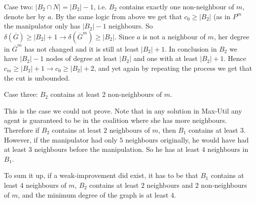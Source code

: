 Case two: $|B_2\cap N| = |B_2| -1$, i.e. $B_2$ contains exactly one non-neighbour of $m$, denote her by $a$.
By the same logic from above we get that $c_0 \geq |B_2|$ (as in $P^m$ the manipulator only has $|B_2| -1$ neighbours. So $\delta(\overline{G}) \geq |B_2| + 1 \rightarrow \delta(\overline{G}^m) \geq |B_2|$. Since $a$ is not a neighbour of $m$, her degree in $\overline{G}^m$ has not changed and it is still at least $|B_2| +1$. In conclusion in $B_2$ we have $|B_2|-1$ nodes of degree at least $|B_2|$ and one with at least $|B_2| +1$. Hence $c_m \geq |B_2| +1 \rightarrow c_0 \geq |B_2| + 2$, and yet again by repeating the process we get that the cut is unbounded.

Case three: $B_2$ contains at least 2 non-neighbours of $m$.

This is the case we could not prove. Note that in any solution in Max-Util any agent is guaranteed to be in the coalition where she has more neighbours. Therefore if $B_2$ contains at least $2$ neighbours of $m$, then $B_1$ contains at least $3$. However, if the manipulator had only $5$ neighbours originally, he would have had at least $3$ neighbours before the manipulation. So he has at least $4$ neighbours in $B_1$.


To sum it up, if a weak-improvement did exist, it has to be that $B_1$ contains at least $4$ neighbours of $m$, $B_2$ contains at least $2$ neighbours and $2$ non-neighbours of $m$, and the minimum degree of the graph is at least $4$.



